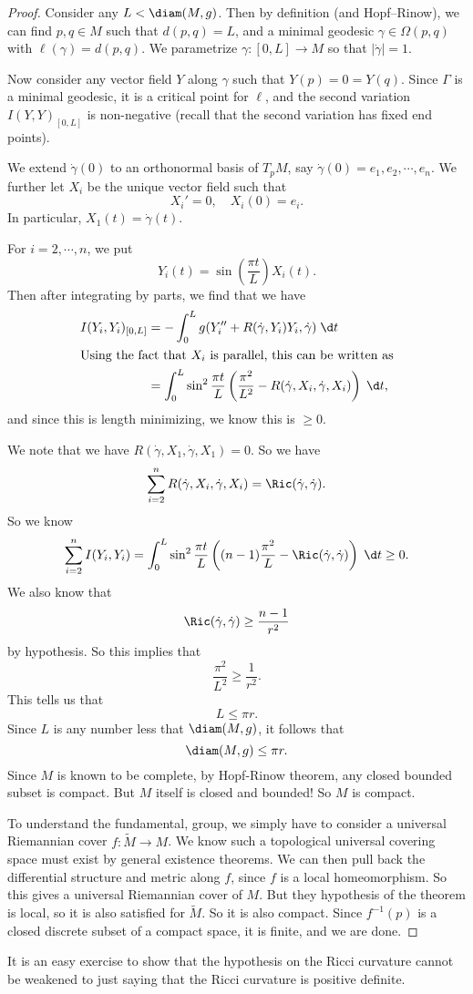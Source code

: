 \documentclass[a4paper]{article}
\begin{document}
\begin{proof}
  Consider any $L < \diam (M, g)$. Then by definition (and Hopf--Rinow), we can find $p, q \in M$ such that $d(p, q) = L$, and a minimal geodesic $\gamma \in \Omega(p, q)$ with $\ell(\gamma) = d(p, q)$. We parametrize $\gamma: [0, L] \to M$ so that $|\dot{\gamma}| = 1$.

  Now consider any vector field $Y$ along $\gamma$ such that $Y(p) = 0 = Y(q)$. Since $\Gamma$ is a minimal geodesic, it is a critical point for $\ell$, and the second variation $I(Y, Y)_{[0, L]}$ is non-negative (recall that the second variation has fixed end points).

  We extend $\dot{\gamma}(0)$ to an orthonormal basis of $T_p M$, say $\dot{\gamma}(0) = e_1, e_2, \cdots, e_n$. We further let $X_i$ be the unique vector field such that
  \[
    X_i' = 0,\quad X_i(0) = e_i.
  \]
  In particular, $X_1(t) = \dot{\gamma}(t)$.

  For $i = 2, \cdots, n$, we put
  \[
    Y_i(t) = \sin \left(\frac{\pi t}{L}\right) X_i(t).
  \]
  Then after integrating by parts, we find that we have
  \begin{align*}
    I(Y_i, Y_i)_{[0,L]} &= - \int_0^L g(Y_i'' + R(\dot{\gamma}, Y_i) Y_i, \dot{\gamma}) \;\d t\\
    \intertext{Using the fact that $X_i$ is parallel, this can be written as}
    &= \int_0^L \sin^2 \frac{\pi t}{L} \left(\frac{\pi^2}{L^2} - R(\dot{\gamma}, X_i, \dot{\gamma}, X_i)\right)\;\d t,
  \end{align*}
  and since this is length minimizing, we know this is $\geq 0$.

  We note that we have $R(\dot{\gamma}, X_1, \dot{\gamma}, X_1) = 0$. So we have
  \[
    \sum_{i = 2}^n R(\dot{\gamma}, X_i, \dot{\gamma}, X_i) = \Ric(\dot{\gamma}, \dot{\gamma}).
  \]
  So we know
  \[
    \sum_{i = 2}^n I(Y_i, Y_i) = \int_0^L \sin^2 \frac{\pi t}{L}\left((n - 1) \frac{\pi^2}{L} - \Ric(\dot{\gamma}, \dot{\gamma})\right)\;\d t \geq 0.
  \]
  We also know that
  \[
    \Ric(\dot{\gamma}, \dot{\gamma}) \geq \frac{n - 1}{r^2}
  \]
  by hypothesis. So this implies that
  \[
    \frac{\pi^2}{L^2} \geq \frac{1}{r^2}.
  \]
  This tells us that
  \[
    L \leq \pi r.
  \]
  Since $L$ is any number less that $\diam(M, g)$, it follows that
  \[
    \diam(M, g) \leq \pi r.
  \]
  Since $M$ is known to be complete, by Hopf-Rinow theorem, any closed bounded subset is compact. But $M$ itself is closed and bounded! So $M$ is compact.

  To understand the fundamental, group, we simply have to consider a universal Riemannian cover $f: \tilde{M} \to M$. We know such a topological universal covering space must exist by general existence theorems. We can then pull back the differential structure and metric along $f$, since $f$ is a local homeomorphism. So this gives a universal Riemannian cover of $M$. But they hypothesis of the theorem is local, so it is also satisfied for $\tilde{M}$. So it is also compact. Since $f^{-1}(p)$ is a closed discrete subset of a compact space, it is finite, and we are done.
\end{proof}
It is an easy exercise to show that the hypothesis on the Ricci curvature cannot be weakened to just saying that the Ricci curvature is positive definite.
\end{document}
